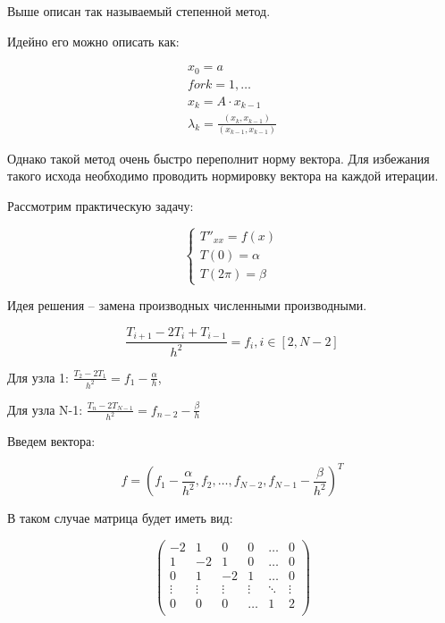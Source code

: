 \documentclass[10pt,a4paper]{article}
\begin{document}
		Выше описан так называемый степенной метод.
		
		Идейно его можно описать как:
		
		\begin{eqnarray}
			x_{0} = a \\
			for k = 1, \ldots \\
			x_{k} = A\cdot x_{k-1}\\
			\lambda_{k} = \frac{\left(x_{k}, x_{k - 1}\right)}
			{\left(x_{k - 1}, x_{k - 1}\right)}
		\end{eqnarray}
		
		Однако такой метод очень быстро переполнит норму вектора. Для избежания 
		такого исхода необходимо проводить нормировку вектора на каждой 
		итерации.
		
		
		Рассмотрим практическую задачу:
		
		\begin{equation}
			\begin{cases}
				T''_{xx} = f\left(x\right)
				\\
				T\left(0\right) = \alpha
				\\
				T\left(2\pi\right) = \beta
			\end{cases}
		\end{equation}
		
		Идея решения -- замена производных численными производными.
		
		\begin{equation}
			\frac{T_{i + 1} - 2T_{i} + T_{i - 1}}{h^{2}} = f_{i}, i \in 
			\left[2, N - 2\right]
		\end{equation}
		
		Для узла 1: $\frac{T_{2} - 2T_{1}}{h^{2}} = f_{1} - \frac{\alpha}{h}$, 
			
		Для  узла N-1: $\frac{T_{n} - 2T_{N-1}}{h^{2}} = 
		f_{n-2} - \frac{\beta}{h}$
		
		Введем вектора:
		
		\begin{equation}
			f = \left(f_{1} - \frac{\alpha}{h^2}, f_{2}, \ldots, f_{N - 2},
			f_{N - 1} - \frac{\beta}{h^{2}}\right)^{T}
		\end{equation}
		
		В таком случае матрица будет иметь вид:
		
		\begin{equation}
			\begin{pmatrix}
				-2 & 1 & 0 & 0 & \ldots & 0 \\
				1 & -2 & 1 & 0 & \ldots & 0 \\
				0 & 1 & -2 & 1 & \ldots & 0 \\
				\vdots & \vdots & \vdots & \vdots & \ddots & \vdots\\
				0 & 0 & 0 & \ldots & 1 & 2\\
			\end{pmatrix}
		\end{equation}
				
\end{document}
